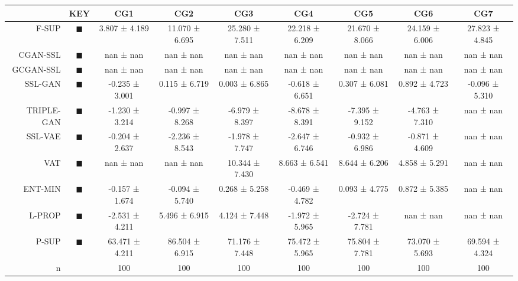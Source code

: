 \begin{tabular}{rcccccccc}
\toprule
 & KEY & CG1 & CG2 & CG3 & CG4 & CG5 & CG6 & CG7 \\
\midrule
F-SUP & \textcolor{FULLY_SUPERVISED_CLASSIFIER}{\LARGE $\blacksquare$} & 3.807 ± 4.189 & 11.070 ± 6.695 & 25.280 ± 7.511 & 22.218 ± 6.209 & 21.670 ± 8.066 & 24.159 ± 6.006 & 27.823 ± 4.845 \\
CGAN-SSL & \textcolor{CGAN_BASIC_DJ_SUPERVISED_CLASSIFIER}{\LARGE $\blacksquare$} & nan ± nan & nan ± nan & nan ± nan & nan ± nan & nan ± nan & nan ± nan & nan ± nan \\
GCGAN-SSL & \textcolor{CGAN_GUMBEL_DJ_SUPERVISED_CLASSIFIER}{\LARGE $\blacksquare$} & nan ± nan & nan ± nan & nan ± nan & nan ± nan & nan ± nan & nan ± nan & nan ± nan \\
SSL-GAN & \textcolor{SSL_GAN}{\LARGE $\blacksquare$} & -0.235 ± 3.001 & 0.115 ± 6.719 & 0.003 ± 6.865 & -0.618 ± 6.651 & 0.307 ± 6.081 & 0.892 ± 4.723 & -0.096 ± 5.310 \\
TRIPLE-GAN & \textcolor{TRIPLE_GAN}{\LARGE $\blacksquare$} & -1.230 ± 3.214 & -0.997 ± 8.268 & -6.979 ± 8.397 & -8.678 ± 8.391 & -7.395 ± 9.152 & -4.763 ± 7.310 & nan ± nan \\
SSL-VAE & \textcolor{SSL_VAE}{\LARGE $\blacksquare$} & -0.204 ± 2.637 & -2.236 ± 8.543 & -1.978 ± 7.747 & -2.647 ± 6.746 & -0.932 ± 6.986 & -0.871 ± 4.609 & nan ± nan \\
VAT & \textcolor{VAT}{\LARGE $\blacksquare$} & nan ± nan & nan ± nan & 10.344 ± 7.430 & 8.663 ± 6.541 & 8.644 ± 6.206 & 4.858 ± 5.291 & nan ± nan \\
ENT-MIN & \textcolor{ENTROPY_MINIMISATION}{\LARGE $\blacksquare$} & -0.157 ± 1.674 & -0.094 ± 5.740 & 0.268 ± 5.258 & -0.469 ± 4.782 & 0.093 ± 4.775 & 0.872 ± 5.385 & nan ± nan \\
L-PROP & \textcolor{LABEL_PROPAGATION}{\LARGE $\blacksquare$} & -2.531 ± 4.211 & 5.496 ± 6.915 & 4.124 ± 7.448 & -1.972 ± 5.965 & -2.724 ± 7.781 & nan ± nan & nan ± nan \\
P-SUP & \textcolor{PARTIAL_SUPERVISED_CLASSIFIER}{\LARGE $\blacksquare$} & 63.471 ± 4.211 & 86.504 ± 6.915 & 71.176 ± 7.448 & 75.472 ± 5.965 & 75.804 ± 7.781 & 73.070 ± 5.693 & 69.594 ± 4.324 \\
n &  & 100 & 100 & 100 & 100 & 100 & 100 & 100 \\
\bottomrule
\end{tabular}
